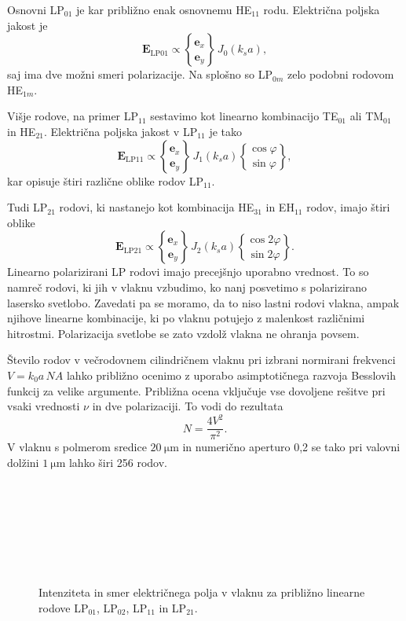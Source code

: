 Osnovni LP$_{01}$ je kar približno enak osnovnemu HE$_{11}$ rodu. Električna poljska jakost je 
\begin{equation}
\mathbf{E}_\mathrm{LP01} \propto { \mathbf{e}_x \brace \mathbf{e}_y} \, J_0(k_s a),
\end{equation}
saj ima dve možni smeri polarizacije. Na splošno so LP$_{0m}$ zelo podobni rodovom HE$_{1m}$. 

Višje rodove, na primer LP$_{11}$ sestavimo kot linearno kombinacijo 
TE$_{01}$ ali TM$_{01}$ in HE$_{21}$.
Električna poljska jakost v LP$_{11}$ je tako 
\begin{equation}
\mathbf{E}_\mathrm{LP11} \propto { \mathbf{e}_x \brace \mathbf{e}_y} \, J_1(k_s a)
{ \cos\varphi \brace \sin\varphi},
\end{equation}
kar opisuje štiri različne oblike rodov LP$_{11}$.

Tudi LP$_{21}$ rodovi, ki nastanejo kot kombinacija HE$_{31}$
in EH$_{11}$ rodov, imajo štiri oblike
\begin{equation}
\mathbf{E}_\mathrm{LP21} \propto { \mathbf{e}_x \brace \mathbf{e}_y} \, J_2(k_s a)
{ \cos 2\varphi \brace \sin 2\varphi}.
\end{equation}
Linearno polarizirani LP rodovi imajo precejšnjo uporabno vrednost. To so 
namreč rodovi, ki jih v vlaknu vzbudimo, ko nanj posvetimo s polarizirano 
lasersko svetlobo. Zavedati pa se moramo, da to niso lastni rodovi vlakna, 
ampak njihove linearne kombinacije, ki po vlaknu potujejo z malenkost različnimi
hitrostmi. Polarizacija svetlobe se zato vzdolž vlakna ne ohranja povsem.
\begin{remark}
Število rodov v večrodovnem cilindričnem vlaknu pri izbrani normirani 
frekvenci $V = k_0a\, NA$ lahko približno ocenimo z uporabo asimptotičnega 
razvoja Besslovih funkcij za velike argumente. Približna ocena vključuje 
vse dovoljene rešitve pri vsaki vrednosti $\nu$ in dve polarizaciji. 
To vodi do rezultata
\begin{equation} 
N = \frac{4 V^2}{\pi^2}.
\end{equation}
V vlaknu s polmerom sredice $20~\si{\micro\meter}$ in numerično aperturo 0,2
se tako pri valovni dolžini $1~\si{\micro\meter}$ lahko širi 256 rodov. 
\end{remark}
\begin{figure}[h!]
\centering
\def\svgwidth{93truemm} 
 \\
\def\svgwidth{93truemm} 
 \\
\def\svgwidth{93truemm} 
 \\
\def\svgwidth{93truemm} 
 \\
\def\svgwidth{93truemm} 
 \\
\def\svgwidth{93truemm} 
 \\
\caption{Intenziteta in smer električnega polja v vlaknu za približno linearne rodove
LP$_{01}$, LP$_{02}$, LP$_{11}$ in LP$_{21}$.}
\label{fig:LP}
\end{figure}

